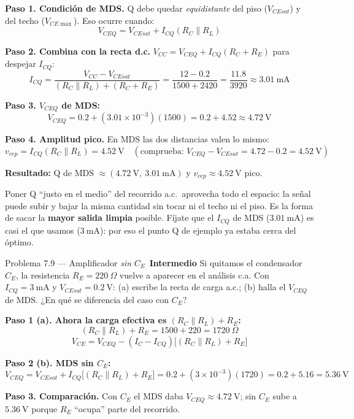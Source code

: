 \documentclass[11pt,a4paper]{article}
\newcommand{\intermedio}{\textcolor{naranjaVivo}{\faIcon{circle}\,\textbf{Intermedio}}}
\begin{document}
\begin{solucionBox}
\textbf{Paso 1. Condición de MDS.} Q debe quedar \emph{equidistante} del piso ($V_{CEsat}$) y del techo ($V_{CE\max}$). Eso ocurre cuando:
\[
V_{CEQ}=V_{CEsat}+I_{CQ}(R_C\parallel R_L)
\]

\textbf{Paso 2. Combina con la recta d.c.} $V_{CC}=V_{CEQ}+I_{CQ}(R_C+R_E)$ para despejar $I_{CQ}$:
\[
I_{CQ}=\frac{V_{CC}-V_{CEsat}}{(R_C\parallel R_L)+(R_C+R_E)}=\frac{12-0.2}{1500+2420}=\frac{11.8}{3920}\approx 3.01\ \text{mA}
\]

\textbf{Paso 3. $V_{CEQ}$ de MDS:}
\[
V_{CEQ}=0.2+(3.01\times10^{-3})(1500)=0.2+4.52\approx 4.72\ \text{V}
\]

\textbf{Paso 4. Amplitud pico.} En MDS las dos distancias valen lo mismo:
\[
v_{cep}=I_{CQ}(R_C\parallel R_L)=4.52\ \text{V}\quad(\text{comprueba: }V_{CEQ}-V_{CEsat}=4.72-0.2=4.52\ \text{V})
\]

\textbf{Resultado:} Q de MDS $\approx(4.72\ \text{V},\ 3.01\ \text{mA})$ y $v_{cep}\approx 4.52\ \text{V}$ pico.
\end{solucionBox}

\begin{porqueBox}
Poner Q ``justo en el medio'' del recorrido a.c.\ aprovecha todo el espacio: la señal puede subir y bajar la misma cantidad sin tocar ni el techo ni el piso. Es la forma de sacar la \textbf{mayor salida limpia} posible. Fíjate que el $I_{CQ}$ de MDS ($3.01\ \text{mA}$) es casi el que usamos ($3\ \text{mA}$): por eso el punto Q de ejemplo ya estaba cerca del óptimo.
\end{porqueBox}

\begin{problemaBox}{Problema 7.9 --- Amplificador \emph{sin} $C_E$ \quad \intermedio}
Si quitamos el condensador $C_E$, la resistencia $R_E=220\ \Omega$ vuelve a aparecer en el análisis c.a. Con $I_{CQ}=3\ \text{mA}$ y $V_{CEsat}=0.2\ \text{V}$: (a) escribe la recta de carga a.c.; (b) halla el $V_{CEQ}$ de MDS. ¿En qué se diferencia del caso con $C_E$?
\end{problemaBox}

\begin{solucionBox}
\textbf{Paso 1 (a). Ahora la carga efectiva es $(R_C\parallel R_L)+R_E$:}
\[
(R_C\parallel R_L)+R_E=1500+220=1720\ \Omega
\]
\[
V_{CE}=V_{CEQ}-(I_C-I_{CQ})\bigl[(R_C\parallel R_L)+R_E\bigr]
\]

\textbf{Paso 2 (b). MDS sin $C_E$:}
\[
V_{CEQ}=V_{CEsat}+I_{CQ}\bigl[(R_C\parallel R_L)+R_E\bigr]=0.2+(3\times10^{-3})(1720)=0.2+5.16=5.36\ \text{V}
\]

\textbf{Paso 3. Comparación.} Con $C_E$ el MDS daba $V_{CEQ}\approx4.72\ \text{V}$; sin $C_E$ sube a $5.36\ \text{V}$ porque $R_E$ ``ocupa'' parte del recorrido.
\end{solucionBox}
\end{document}
